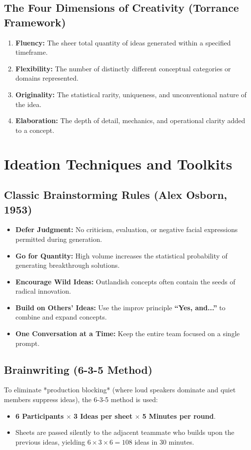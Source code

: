 \subsection{The Four Dimensions of Creativity (Torrance Framework)}
\begin{enumerate}[leftmargin=1.2em, itemsep=3pt]
    \item \textbf{Fluency:} The sheer total quantity of ideas generated within a specified timeframe.
    \item \textbf{Flexibility:} The number of distinctly different conceptual categories or domains represented.
    \item \textbf{Originality:} The statistical rarity, uniqueness, and unconventional nature of the idea.
    \item \textbf{Elaboration:} The depth of detail, mechanics, and operational clarity added to a concept.
\end{enumerate}

\section{Ideation Techniques and Toolkits}

\subsection{Classic Brainstorming Rules (Alex Osborn, 1953)}
\begin{itemize}[leftmargin=1.2em, itemsep=2pt]
    \item \textbf{Defer Judgment:} No criticism, evaluation, or negative facial expressions permitted during generation.
    \item \textbf{Go for Quantity:} High volume increases the statistical probability of generating breakthrough solutions.
    \item \textbf{Encourage Wild Ideas:} Outlandish concepts often contain the seeds of radical innovation.
    \item \textbf{Build on Others' Ideas:} Use the improv principle \textbf{``Yes, and...''} to combine and expand concepts.
    \item \textbf{One Conversation at a Time:} Keep the entire team focused on a single prompt.
\end{itemize}

\subsection{Brainwriting (6-3-5 Method)}
To eliminate *production blocking* (where loud speakers dominate and quiet members suppress ideas), the 6-3-5 method is used:
\begin{itemize}[leftmargin=1.2em, itemsep=2pt]
    \item \textbf{6 Participants} $\times$ \textbf{3 Ideas per sheet} $\times$ \textbf{5 Minutes per round}.
    \item Sheets are passed silently to the adjacent teammate who builds upon the previous ideas, yielding $6 \times 3 \times 6 = 108$ ideas in 30 minutes.
\end{itemize}

